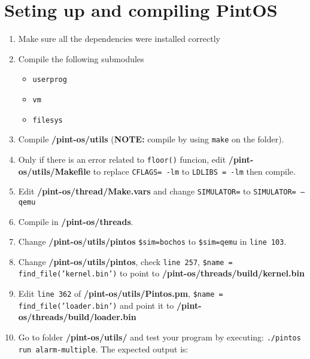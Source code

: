 \documentclass[12pt]{article}
\begin{document}
\section{Seting up and compiling PintOS}
\begin{enumerate}
	\item Make sure all the dependencies were installed correctly
	\item Compile the following submodules
	\begin{itemize}
		\item \texttt{userprog}
		\item \texttt{vm}
		\item \texttt{filesys}
	\end{itemize}
	\item Compile \textbf{/pint-os/utils} (\textbf{NOTE:} compile by using \texttt{make} on the folder).
	\item Only if there is an error related to \texttt{floor()} funcion, edit \textbf{/pint-os/utils/Makefile} to replace \texttt{CFLAGS= -lm} to \texttt{LDLIBS = -lm} then compile.
	\item Edit \textbf{/pint-os/thread/Make.vars} and change \texttt{SIMULATOR=} to \texttt{SIMULATOR= --qemu} 
	\item Compile in \textbf{/pint-os/threads}.
	\item Change \textbf{/pint-os/utils/pintos} \texttt{\$sim=bochos} to \texttt{\$sim=qemu} in \texttt{line 103}.
	\item Change \textbf{/pint-os/utils/pintos}, check \texttt{line 257}, \texttt{\$name = find\_file('kernel.bin')} to point to \textbf{/pint-os/threads/build/kernel.bin}
	\item Edit \texttt{line 362} of \textbf{/pint-os/utils/Pintos.pm}, \texttt{\$name = find\_file('loader.bin')} and point it to \textbf{/pint-os/threads/build/loader.bin}
	\item Go to folder \textbf{/pint-os/utils/} and test your program by executing: \texttt{./pintos run alarm-multiple}. The expected output is:


\end{enumerate}
\end{document}
